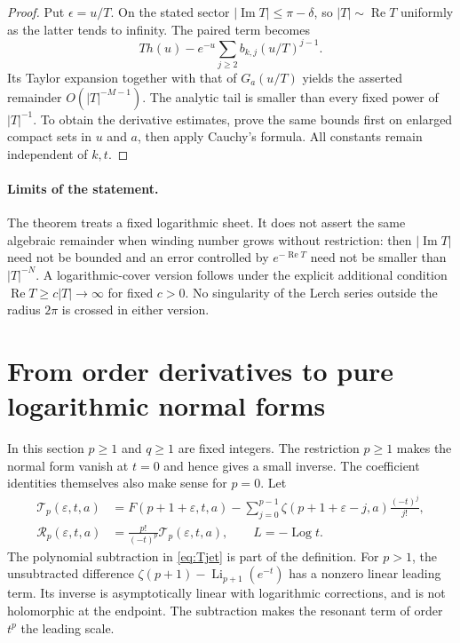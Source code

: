 \documentclass[11pt,a4paper]{article}
\numberwithin{equation}{section}
\theoremstyle{definition}
\theoremstyle{remark}
\DeclareMathOperator{\Li}{Li}
\DeclareMathOperator{\Log}{Log}
\newcommand{\eps}{\varepsilon}
\newcommand{\cR}{\mathcal R}
\newcommand{\cT}{\mathcal T}
\begin{document}
\begin{proof}
Put $\epsilon=u/T$. On the stated sector $|\operatorname{Im}T|\le
\pi-\delta$, so $|T|\sim\operatorname{Re}T$ uniformly as the latter
tends to infinity. The paired term becomes
\[
 T h(u)-e^{-u}\sum_{j\ge2}b_{k,j}(u/T)^{j-1}.
\]
Its Taylor expansion together with that of $G_a(u/T)$ yields the
asserted remainder $O(|T|^{-M-1})$. The analytic tail is smaller than
every fixed power of $|T|^{-1}$. To obtain the derivative estimates,
prove the same bounds first on enlarged compact sets in $u$ and $a$,
then apply Cauchy's formula. All constants remain independent of $k,t$.
\end{proof}

\paragraph{Limits of the statement.}
The theorem treats a fixed logarithmic sheet. It does not assert the
same algebraic remainder when winding number grows without restriction:
then $|\operatorname{Im}T|$ need not be bounded and an error controlled
by $e^{-\operatorname{Re}T}$ need not be smaller than $|T|^{-N}$. A
logarithmic-cover version follows under the explicit additional condition
$\operatorname{Re}T\ge c|T|\to\infty$ for fixed $c>0$. No singularity of
the Lerch series outside the radius $2\pi$ is crossed in either version.



\section{From order derivatives to pure logarithmic normal forms}
\label{sec:jets}

In this section $p\ge1$ and $q\ge1$ are fixed integers. The restriction
$p\ge1$ makes the normal form vanish at $t=0$ and hence gives a small
inverse. The coefficient identities themselves also make sense for
$p=0$. Let
\begin{align}
 \cT_p(\eps,t,a)&=F(p+1+\eps,t,a)
  -\sum_{j=0}^{p-1}\zeta(p+1+\eps-j,a)\frac{(-t)^j}{j!},
  \label{eq:Tjet}\\
 \cR_p(\eps,t,a)&=\frac{p!}{(-t)^p}\cT_p(\eps,t,a),\qquad
 L=-\Log t.\label{eq:Rjet}
\end{align}
The polynomial subtraction in \eqref{eq:Tjet} is part of the definition.
For $p>1$, the unsubtracted difference $\zeta(p+1)-\Li_{p+1}(e^{-t})$
has a nonzero linear leading term. Its inverse is asymptotically linear
with logarithmic corrections, and is not holomorphic at the endpoint.
The subtraction makes the resonant term of order $t^p$ the leading scale.
\end{document}
